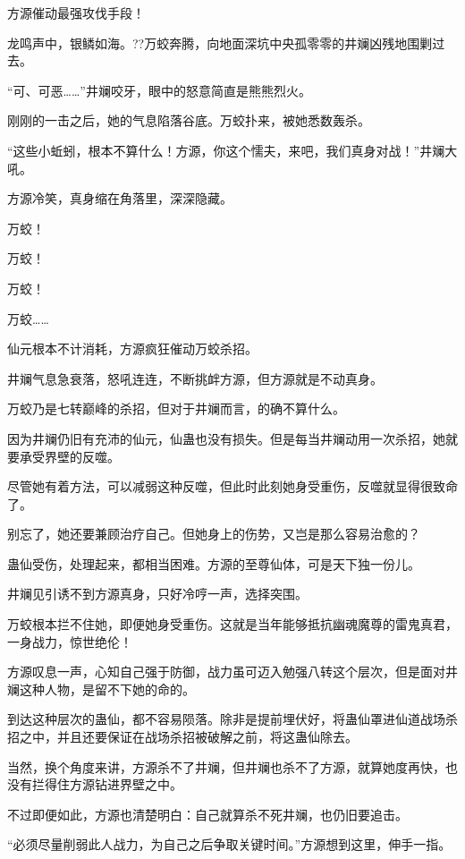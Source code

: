 
\begin{this_body}

方源催动最强攻伐手段！

龙鸣声中，银鳞如海。??万蛟奔腾，向地面深坑中央孤零零的井斓凶残地围剿过去。

“可、可恶……”井斓咬牙，眼中的怒意简直是熊熊烈火。

刚刚的一击之后，她的气息陷落谷底。万蛟扑来，被她悉数轰杀。

“这些小蚯蚓，根本不算什么！方源，你这个懦夫，来吧，我们真身对战！”井斓大吼。

方源冷笑，真身缩在角落里，深深隐藏。

万蛟！

万蛟！

万蛟！

万蛟……

仙元根本不计消耗，方源疯狂催动万蛟杀招。

井斓气息急衰落，怒吼连连，不断挑衅方源，但方源就是不动真身。

万蛟乃是七转巅峰的杀招，但对于井斓而言，的确不算什么。

因为井斓仍旧有充沛的仙元，仙蛊也没有损失。但是每当井斓动用一次杀招，她就要承受界壁的反噬。

尽管她有着方法，可以减弱这种反噬，但此时此刻她身受重伤，反噬就显得很致命了。

别忘了，她还要兼顾治疗自己。但她身上的伤势，又岂是那么容易治愈的？

蛊仙受伤，处理起来，都相当困难。方源的至尊仙体，可是天下独一份儿。

井斓见引诱不到方源真身，只好冷哼一声，选择突围。

万蛟根本拦不住她，即便她身受重伤。这就是当年能够抵抗幽魂魔尊的雷鬼真君，一身战力，惊世绝伦！

方源叹息一声，心知自己强于防御，战力虽可迈入勉强八转这个层次，但是面对井斓这种人物，是留不下她的命的。

到达这种层次的蛊仙，都不容易陨落。除非是提前埋伏好，将蛊仙罩进仙道战场杀招之中，并且还要保证在战场杀招被破解之前，将这蛊仙除去。

当然，换个角度来讲，方源杀不了井斓，但井斓也杀不了方源，就算她度再快，也没有拦得住方源钻进界壁之中。

不过即便如此，方源也清楚明白：自己就算杀不死井斓，也仍旧要追击。

“必须尽量削弱此人战力，为自己之后争取关键时间。”方源想到这里，伸手一指。


\end{this_body}
